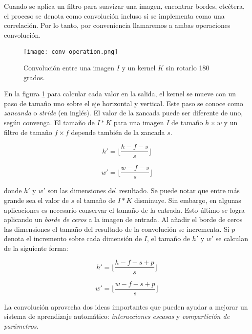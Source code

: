 Cuando se aplica un filtro para suavizar una imagen, encontrar bordes, etcétera, el 
proceso se denota como convolución incluso si se implementa como una correlación. Por
lo tanto, por conveniencia llamaremos a ambas operaciones convolución.

\begin{figure}[h]
    \centering
    \texttt{[image: conv\_operation.png]}
    \caption{Convolución entre una imagen
    $I$ y un kernel $K$ sin rotarlo 180 grados.}
    \label{fig:convolution_example}
\end{figure}

En la figura \ref{fig:convolution_example} para calcular
cada valor en la salida, el kernel se mueve con un paso 
de tamaño uno sobre el eje horizontal y vertical. Este paso
se conoce como \textit{zancanda} o \textit{stride} (en inglés).
El valor de la zancada puede ser diferente de uno, según 
convenga. El tamaño de $I * K$ para una imagen $I$ de tamaño
$h \times w$ y un filtro de tamaño $f \times f$ depende también de
la zancada $s$.

\[
h' = \lfloor\frac{h-f-s}{s}\rfloor
\]

\[
w' = \lfloor\frac{w-f-s}{s}\rfloor
\]

donde $h'$ y $w'$ son las dimensiones del resultado.
Se puede notar que entre más grande sea el valor de $s$
el tamaño de $I * K$ disminuye. Sin embargo, en algunas 
aplicaciones es necesario conservar el tamaño de la entrada.
Esto último se logra aplicando un \textit{borde de ceros}
a la imagen de entrada. Al añadir el borde de ceros las
dimensiones el tamaño del resultado de la convolución se 
incrementa. Si $p$ denota el incremento sobre cada dimensión
de $I$, el tamaño de $h'$ y $w'$ se calculan de la siguiente 
forma:


\[
h' = \lfloor\frac{h-f-s+p}{s}\rfloor
\]

\[
w' = \lfloor\frac{w-f-s+p}{s}\rfloor
\]


La convolución aprovecha dos ideas importantes que pueden ayudar a mejorar un
sistema de aprendizaje automático: \textit{interacciones escasas} y \textit{compartición de parámetros}.

